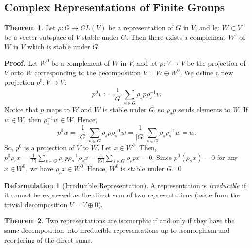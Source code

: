 \documentclass{article}
\theoremstyle{definition}
\newtheorem{reformulation}{Reformulation}[subsection]
\newtheorem{theorem}{Theorem}[subsection]
\begin{document}
\subsection{Complex Representations of Finite Groups}
\begin{theorem}
Let $\rho:G\rightarrow GL(V)$ be a representation of $G$ in $V$, and let $W\subset V$ be a vector subspace of $V$ stable under $G$. Then there exists a complement $W^0$ of $W$ in $V$ which is stable under $G$.
\end{theorem}
\textbf{Proof.} Let $W^0$ be a complement of $W$ in $V$, and let $p:V\rightarrow V$ be the projection of $V$ onto $W$ corresponding to the decomposition $V=W\oplus W^0$. We define a new projection $p^0:V\rightarrow V$:
\begin{equation*}
    p^0v:=\frac1{|G|}\sum_{s\in G}\rho_s p\rho_s^{-1}v.
\end{equation*}
Notice that $p$ maps to $W$ and $W$ is stable under $G$, so $\rho_sp$ sends elements to $W$. If $w\in W$, then $\rho_s^{-1}w\in W$. Hence,
\begin{equation*}
    p^0w=\frac1{|G|}\sum_{s\in G}\rho_s p\rho_s^{-1}w=\frac1{|G|}\sum_{s\in G}\rho_s \rho_s^{-1}w=w.
\end{equation*} 
So, $p^0$ is a projection of $V$ to $W$.
\newline
\newline
Let $x\in W^0$. Then, $p^0\rho_s x=\frac1{|G|}\sum_{s\in G}\rho_s p\rho_s^{-1}\rho_s x=\frac1{|G|}\sum_{s\in G}\rho_s px=0$. Since $p^0(\rho_s x)=0$ for any $x\in W^0$, we have $\rho_s x\in W^0$. Hence, $W^0$ is stable under $G$. \qed

\begin{reformulation}[Irreducible Representation]
    A representation is \textit{irreducible} if it cannot be expressed as the direct sum of two representations (aside from the trivial decomposition $V=V\oplus 0$).
\end{reformulation}

\begin{theorem}
    Two representations are isomorphic if and only if they have the same decomposition into irreducible representations up to isomorphism and reordering of the direct sums.
\end{theorem}
\end{document}
